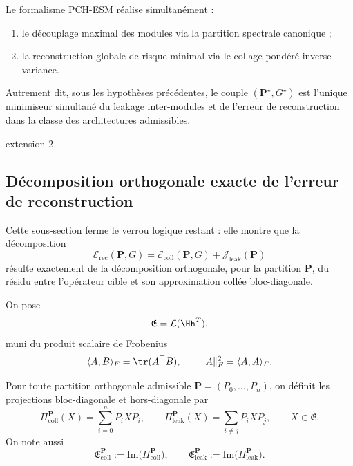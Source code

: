 \begin{corollary}
Le formalisme PCH-ESM réalise simultanément :
\begin{enumerate}[leftmargin=2em]
    \item le découplage maximal des modules via la partition spectrale canonique ;
    \item la reconstruction globale de risque minimal via le collage pondéré inverse-variance.
\end{enumerate}
Autrement dit, sous les hypothèses précédentes, le couple \((\mathbf P^\star,G^\star)\) est l'unique minimiseur simultané du leakage inter-modules et de l'erreur de reconstruction dans la classe des architectures admissibles.
\end{corollary}






extension 2
\subsection{Décomposition orthogonale exacte de l'erreur de reconstruction}

Cette sous-section ferme le verrou logique restant : elle montre que la décomposition
\[
\mathcal E_{\mathrm{rec}}(\mathbf P,G)
=
\mathcal E_{\mathrm{coll}}(\mathbf P,G)
+
\mathcal J_{\mathrm{leak}}(\mathbf P)
\]
résulte exactement de la décomposition orthogonale, pour la partition \(\mathbf P\), du résidu
entre l'opérateur cible et son approximation collée bloc-diagonale.

\begin{definition}
On pose
\[
\mathfrak E=\mathcal L(\Hh^T),
\]
muni du produit scalaire de Frobenius
\[
\langle A,B\rangle_F=\tr(A^\top B),
\qquad
\|A\|_F^2=\langle A,A\rangle_F.
\]
\end{definition}

\begin{definition}
Pour toute partition orthogonale admissible \(\mathbf P=(P_0,\dots,P_n)\), on définit les projections
bloc-diagonale et hors-diagonale par
\[
\Pi_{\mathrm{coll}}^{\mathbf P}(X)
=
\sum_{i=0}^n P_iXP_i,
\qquad
\Pi_{\mathrm{leak}}^{\mathbf P}(X)
=
\sum_{i\neq j}P_iXP_j,
\qquad
X\in\mathfrak E.
\]
On note aussi
\[
\mathfrak E_{\mathrm{coll}}^{\mathbf P}:=\mathrm{Im}\bigl(\Pi_{\mathrm{coll}}^{\mathbf P}\bigr),
\qquad
\mathfrak E_{\mathrm{leak}}^{\mathbf P}:=\mathrm{Im}\bigl(\Pi_{\mathrm{leak}}^{\mathbf P}\bigr).
\]
\end{definition}

